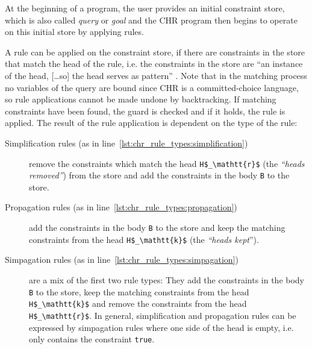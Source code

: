 At the beginning of a program, the user provides an initial constraint store, which is also called \emph{query} or \emph{goal} and the CHR program then begins to operate on this initial store by applying rules.

A rule can be applied on the constraint store, if there are constraints in the store that match the head of the rule, i.e. the constraints in the store are ``an instance of the head, [\dots so] the head serves as pattern'' \cite[11]{fru_chr_book_2009}. Note that in the matching process no variables of the query are bound since CHR is a committed-choice language, so rule applications cannot be made undone by backtracking. If matching constraints have been found, the guard is checked and if it holds, the rule is applied. The result of the rule application is dependent on the type of the rule:

\begin{description}
 \item[Simplification rules (as in line~\ref{lst:chr_rule_types:simplification})] remove the constraints which match the head \lstinline[mathescape]|H$_\mathtt{r}$| (the \emph{``heads removed''}) from the store and add the constraints in the body \lstinline|B| to the store.
 \item[Propagation rules (as in line~\ref{lst:chr_rule_types:propagation})] add the constraints in the body \lstinline|B| to the store and keep the matching constraints from the head \lstinline[mathescape]|H$_\mathtt{k}$| (the \emph{``heads kept}'').
 \item[Simpagation rules (as in line~\ref{lst:chr_rule_types:simpagation})] are a mix of the first two rule types: They add the constraints in the body \lstinline|B| to the store, keep the matching constraints from the head \lstinline[mathescape]|H$_\mathtt{k}$| and remove the constraints from the head \lstinline[mathescape]|H$_\mathtt{r}$|. In general, simplification and propagation rules can be expressed by simpagation rules where one side of the head is empty, i.e. only contains the constraint \lstinline|true|.
\end{description}

